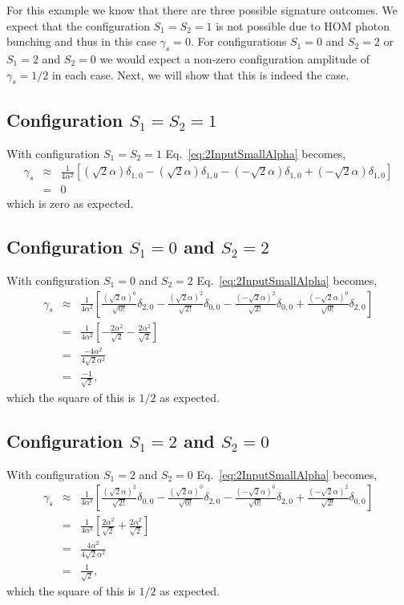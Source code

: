 \documentclass[aps,pra,singlecolumn,amsmath,amssymb,nofootinbib,superscriptaddress]{revtex4}
\begin{document}
For this example we know that there are three possible signature outcomes. We expect that the configuration $S_1=S_2=1$ is not possible due to HOM photon bunching and thus in this case $\gamma_s=0$. For configurations $S_1=0$ and $S_2=2$ or $S_1=2$ and $S_2=0$ we would expect a non-zero configuration amplitude of $\gamma_s=1/2$ in each case. Next, we will show that this is indeed the case. 
\subsection{Configuration $S_1=S_2=1$}
With configuration $S_1=S_2=1$ Eq.~\ref{eq:2InputSmallAlpha} becomes,
\begin{eqnarray}
\gamma_s &\approx& \frac{1}{4\alpha^2} \left[ 
(\sqrt{2}\alpha)\delta_{1,0}
-(\sqrt{2}\alpha)\delta_{1,0}
-(-\sqrt{2}\alpha)\delta_{1,0}
+(-\sqrt{2}\alpha)\delta_{1,0} \right] \nonumber \\
&=& 0
\end{eqnarray}
which is zero as expected. 

\subsection{Configuration $S_1=0$ and $S_2=2$}
With configuration $S_1=0$ and $S_2=2$ Eq.~\ref{eq:2InputSmallAlpha} becomes,
\begin{eqnarray}
\gamma_s &\approx& \frac{1}{4\alpha^2} \left[ 
\frac{(\sqrt{2}\alpha)^{0}}{\sqrt{0!}}\delta_{2,0}
-\frac{(\sqrt{2}\alpha)^{2}}{\sqrt{2!}}\delta_{0,0}
-\frac{(-\sqrt{2}\alpha)^{2}}{\sqrt{2!}}\delta_{0,0}
+\frac{(-\sqrt{2}\alpha)^{0}}{\sqrt{0!}}\delta_{2,0} \right] \nonumber \\
&=& \frac{1}{4\alpha^2} \left[ 
-\frac{2\alpha^{2}}{\sqrt{2}}
-\frac{2\alpha^{2}}{\sqrt{2}} \right] \nonumber \\
&=& \frac{-4\alpha^2}{4\sqrt{2}\alpha^2} \nonumber \\
&=& \frac{-1}{\sqrt{2}},
\end{eqnarray}
which the square of this is $1/2$ as expected.

\subsection{Configuration $S_1=2$ and $S_2=0$}
With configuration $S_1=2$ and $S_2=0$ Eq.~\ref{eq:2InputSmallAlpha} becomes,
\begin{eqnarray}
\gamma_s &\approx& \frac{1}{4\alpha^2} \left[ 
\frac{(\sqrt{2}\alpha)^{2}}{\sqrt{2!}}\delta_{0,0}
-\frac{(\sqrt{2}\alpha)^{0}}{\sqrt{0!}}\delta_{2,0}
-\frac{(-\sqrt{2}\alpha)^{0}}{\sqrt{0!}}\delta_{2,0}
+\frac{(-\sqrt{2}\alpha)^{2}}{\sqrt{2!}}\delta_{0,0} \right] \nonumber \\
&=& \frac{1}{4\alpha^2} \left[ 
\frac{2\alpha^{2}}{\sqrt{2}}
+\frac{2\alpha^{2}}{\sqrt{2}} \right] \nonumber \\
&=& \frac{4\alpha^2}{4\sqrt{2}\alpha^2} \nonumber \\
&=& \frac{1}{\sqrt{2}},
\end{eqnarray}
which the square of this is $1/2$ as expected.
\end{document}
